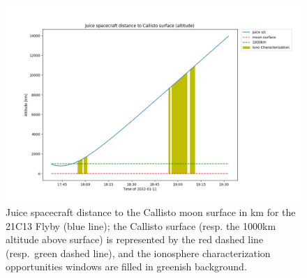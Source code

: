 \documentclass[referee]{aa}
\begin{document}
\begin{figure}
    \centering
    \includegraphics[width=\textwidth]{SC_to_Callisto_Distance_C_20320111T173800_20320111T193300_2D.png}
    \caption{Juice spacecraft distance to the Callisto moon surface in km for the 21C13 Flyby (blue line); the Callisto surface (resp. the 1000km altitude above surface) is represented by the red dashed line (resp.\ green dashed line), and the ionosphere characterization opportunities windows are filled in greenish background. }
    \label{JUICE SOC-fig2}
\end{figure}
\end{document}
